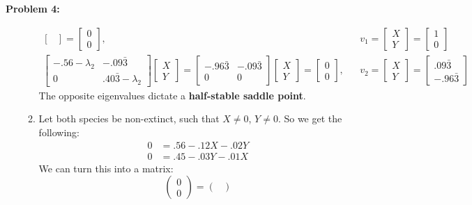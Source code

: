 \documentclass[11pt]{article}
\newenvironment{problem}[1]{\textbf{Problem #1: }}{\newpage}
\begin{document}
\begin{problem}{4}
\begin{enumerate}[label = (\alph*)]
\begin{enumerate}[label = (\roman*)]
\begin{align*}
\begin{bmatrix}
				\end{bmatrix} = 
				\begin{bmatrix}
				0 \\ 0
				\end{bmatrix}, && v_1 = \begin{bmatrix}
				X \\ Y
				\end{bmatrix} = 
				\begin{bmatrix}
				1 \\ 0
				\end{bmatrix}
				\\ 
				\begin{bmatrix}
				-.56 - \lambda_2 & -.09\bar{3} \\ 0 & .40\bar{3} -\lambda_2
				\end{bmatrix}\begin{bmatrix}
				X \\ Y
				\end{bmatrix} = 
				\begin{bmatrix}
				-.96\bar{3} & -.09\bar{3} \\ 0 & 0
				\end{bmatrix}\begin{bmatrix}
				X \\ Y
				\end{bmatrix} = 
				\begin{bmatrix}
				0 \\ 0
				\end{bmatrix}, && v_2 = \begin{bmatrix}
				X \\ Y
				\end{bmatrix} = 
				\begin{bmatrix}
				.09\bar{3} \\ -.96\bar{3}
				\end{bmatrix}
				\end{align*}
				The opposite eigenvalues dictate a \textbf{half-stable saddle point}.
				\newpage
				\item Let both species be non-extinct, such that $X \not= 0$, $Y \not = 0$. So we get the following:
				\begin{align*}
					0 &= .56 - .12X - .02Y \\
					0 &= .45 - .03Y - .01X
				\end{align*}
				We can turn this into a matrix:
				\[\begin{pmatrix}
					0 \\ 0
				\end{pmatrix} = \begin{pmatrix}

\end{pmatrix}\]
\end{enumerate}
\end{enumerate}
\end{problem}
\end{document}
